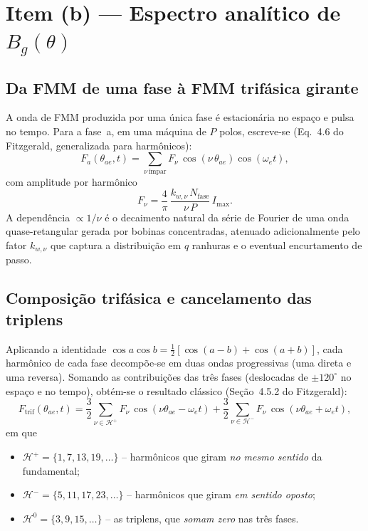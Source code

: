 \documentclass[12pt,a4paper]{article}
\begin{document}
\section{Item (b) --- Espectro analítico de \texorpdfstring{$B_g(\theta)$}{Bg(theta)}}
\label{sec:itemb}

\subsection{Da FMM de uma fase à FMM trifásica girante}

A onda de FMM produzida por uma única fase é estacionária no espaço e pulsa no tempo. Para a fase~a, em uma máquina de $P$ polos, escreve-se (Eq.~4.6 do Fitzgerald, generalizada para harmônicos):
\begin{equation}
F_a(\theta_{ae},t) = \sum_{\nu \,\text{ímpar}} F_{\nu}\,\cos(\nu\,\theta_{ae})\cos(\omega_e t),
\label{eq:Fa}
\end{equation}
com amplitude por harmônico
\begin{equation}
F_{\nu} = \frac{4}{\pi}\,\frac{k_{w,\nu}\,N_{\text{fase}}}{\nu\,P}\,I_{\max}.
\label{eq:Fnu}
\end{equation}
A dependência $\propto 1/\nu$ é o decaimento natural da série de Fourier de uma onda quase-retangular gerada por bobinas concentradas, atenuado adicionalmente pelo fator $k_{w,\nu}$ que captura a distribuição em $q$ ranhuras e o eventual encurtamento de passo.

\subsection{Composição trifásica e cancelamento das triplens}
\label{sec:trif}

Aplicando a identidade $\cos a\cos b = \tfrac{1}{2}[\cos(a-b)+\cos(a+b)]$, cada harmônico de cada fase decompõe-se em duas ondas progressivas (uma direta e uma reversa). Somando as contribuições das três fases (deslocadas de $\pm 120^{\circ}$ no espaço e no tempo), obtém-se o resultado clássico (Seção~4.5.2 do Fitzgerald):
\begin{equation}
F_{\text{trif}}(\theta_{ae},t) = \frac{3}{2}\sum_{\nu \in \mathcal{H}^+} F_{\nu}\,\cos(\nu\theta_{ae}-\omega_e t)
                                + \frac{3}{2}\sum_{\nu \in \mathcal{H}^-} F_{\nu}\,\cos(\nu\theta_{ae}+\omega_e t),
\end{equation}
em que
\begin{itemize}
    \item $\mathcal{H}^+ = \{1,7,13,19,\ldots\}$ -- harmônicos que giram \emph{no mesmo sentido} da fundamental;
    \item $\mathcal{H}^- = \{5,11,17,23,\ldots\}$ -- harmônicos que giram \emph{em sentido oposto};
    \item $\mathcal{H}^0 = \{3,9,15,\ldots\}$ -- as triplens, que \emph{somam zero} nas três fases.
\end{itemize}
\end{document}
